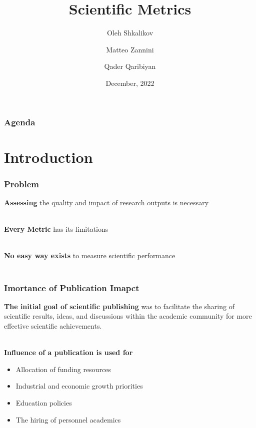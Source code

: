 \documentclass{beamer}
\title[Scientific metrics]{Scientific Metrics}
\author[O. Shkalikov \and M. Zannini \and Q.Qaribiyan]
{Oleh Shkalikov \and Matteo Zannini \and Qader Qaribiyan}
\institute[]{TU Dresden, Computer Science Faculty}
\date{December, 2022}
\begin{document}
\frame{\titlepage}

\begin{frame}
    \frametitle{Agenda}
    \tableofcontents
\end{frame}

\section{Introduction}
\begin{frame}

    \frametitle{Problem}

    \textbf{Assessing} the quality and impact of research outputs is necessary \\~\

    \textbf{Every Metric} has its limitations\\~\

    \textbf{No easy way exists} to measure scientific performance\\~\

\end{frame}
\begin{frame}

    \frametitle{Imortance of Publication Imapct}

    \textbf{The initial goal of scientific publishing} was to facilitate the sharing of scientific results, ideas, and discussions within the academic community for more effective scientific achievements. \\~\

    \textbf{Influence of a publication is used for}

    \begin{itemize}
        \item Allocation of funding resources
        \item Industrial and economic growth priorities
        \item Education policies
        \item The hiring of personnel academics
    \end{itemize}

\end{frame}
\end{document}
